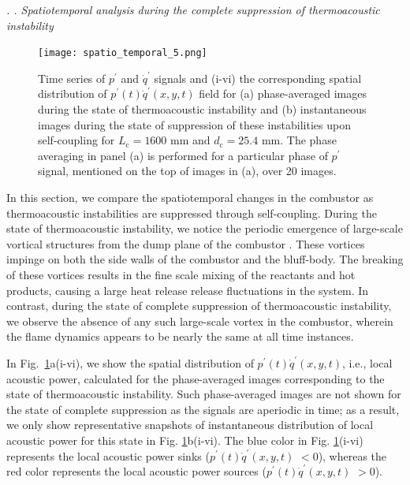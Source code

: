 \documentclass[twocolumn,10pt]{article} %
\renewcommand{\subsection}%
              [1]%
              {%
               \bgroup%
               \flushleft%
               \small\em%
               \stepcounter{subsection}%
               \arabic{section}.%
               \arabic{subsection}. #1%
               \par%
               \egroup%
              }%
\begin{document}
\subsection{Spatiotemporal analysis during the complete suppression of thermoacoustic instability} \addvspace{10pt}
\begin{figure}[t!]
\centering
\texttt{[image: spatio\_temporal\_5.png]}
\caption{Time series of $p^{\prime}$ and $\dot{q}^{\prime}$ signals and (i-vi) the corresponding spatial distribution of $p^\prime(t)\dot{q}^\prime(x,y,t)$ field for  (a) phase-averaged images during the state of thermoacoustic instability and (b) instantaneous images during the state of suppression of these instabilities upon self-coupling for $L_{\text{c}} = 1600$ mm and $d_{\text{c}} = 25.4$ mm. The phase averaging in panel (a) is performed for a particular phase of $p^{\prime}$ signal, mentioned on the top of images in (a), over 20 images. }
\label{fig5}
\end{figure}

In this section, we compare the spatiotemporal changes in the combustor as thermoacoustic instabilities are suppressed through self-coupling. During the state of thermoacoustic instability, we notice the periodic emergence of large-scale vortical structures from the dump plane of the combustor \cite{sujith2021thermoacoustic}. These vortices impinge on both the side walls of the combustor and the bluff-body. The breaking of these vortices results in the fine scale mixing of the reactants and hot products, causing a large heat release release fluctuations in the system. In contrast, during the state of complete suppression of thermoacoustic instability, we observe the absence of any such large-scale vortex in the combustor, wherein the flame dynamics appears to be nearly the same at all time instances. 

In Fig.~\ref{fig5}a(i-vi), we show the spatial distribution of $p^\prime(t) \dot{q}^\prime(x,y,t)$, i.e., local acoustic power, calculated for the phase-averaged images corresponding to the state of thermoacoustic instability. Such phase-averaged images are not shown for the state of complete suppression as the signals are aperiodic in time; as a result, we only show representative snapshots of instantaneous distribution of local acoustic power for this state in Fig. \ref{fig5}b(i-vi). The blue color in Fig. \ref{fig5}(i-vi) represents the local acoustic power sinks ($p^\prime(t) \dot{q}^\prime(x,y,t)$ $<0$), whereas the red color represents the local acoustic power sources ($p^\prime(t) \dot{q}^\prime(x,y,t)$ $>0$).
\end{document}
